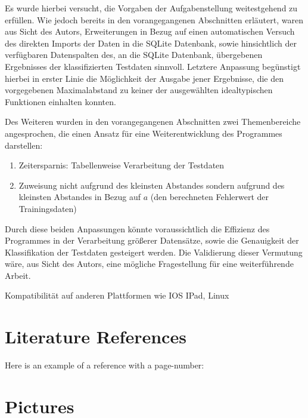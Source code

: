 Es wurde hierbei versucht, die Vorgaben der Aufgabenstellung weitestgehend zu erfüllen. Wie jedoch bereits in den vorangegangenen Abschnitten erläutert, waren aus Sicht des Autors, Erweiterungen in Bezug auf einen automatischen Versuch des direkten Imports der Daten in die SQLite Datenbank, sowie hinsichtlich der verfügbaren Datenspalten des, an die SQLite Datenbank, übergebenen Ergebnisses der klassifizierten Testdaten sinnvoll. Letztere Anpassung begünstigt hierbei in erster Linie die Möglichkeit der Ausgabe jener Ergebnisse, die den vorgegebenen Maximalabstand zu keiner der ausgewählten idealtypischen Funktionen einhalten konnten.

Des Weiteren wurden in den vorangegangenen Abschnitten zwei Themenbereiche angesprochen, die einen Ansatz für eine Weiterentwicklung des Programmes darstellen:

\begin{enumerate}
 \itemsep0pt
 \item Zeitersparnis: Tabellenweise Verarbeitung der Testdaten
 \item Zuweisung nicht aufgrund des kleinsten Abstandes sondern aufgrund des kleinsten Abstandes in Bezug auf $a$ (den berechneten Fehlerwert der Trainingsdaten)
\end{enumerate}

Durch diese beiden Anpassungen könnte voraussichtlich die Effizienz des Programmes in der Verarbeitung größerer Datensätze, sowie die Genauigkeit der Klassifikation der Testdaten gesteigert werden. Die Validierung dieser Vermutung wäre, aus Sicht des Autors, eine mögliche Fragestellung für eine weiterführende Arbeit. 

Kompatibilität auf anderen Plattformen wie IOS IPad, Linux

\section{Literature References}
Here is an example of a reference with a page-number: \cite[S. 6]{DueckKo:2016}


\section{Pictures}

